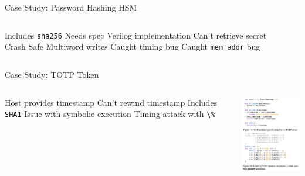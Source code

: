 \begin{frame}{Case Study: Password Hashing HSM}
\begin{columns}
  \begin{outline}
    \1 Includes \lstinline{sha256}
    \2 Needs spec
    \2 Verilog implementation
    \1 Can't retrieve secret
    \1 Crash Safe 
    \2 Multiword writes
    \2 Caught timing bug
    \1 Caught \lstinline{mem_addr} bug
  \end{outline}

  \centering
  \begin{center}
\end{center}
\end{columns}
\end{frame}

\placelogofalse
\begin{frame}{Case Study: TOTP Token}
\begin{columns}
  \begin{outline}
    \1 Host provides timestamp
    \1 Can't rewind timestamp
    \1 Includes \lstinline{SHA1} 
    \1 Issue with symbolic execution
    \1 Timing attack with \lstinline{\%} 
  \end{outline}

  \centering
  \begin{center}
  \includegraphics[width=5cm]{totp_spec.png}
  \end{center}
\end{columns}
\end{frame}
\placelogotrue
